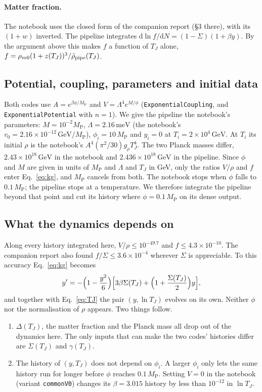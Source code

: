 \documentclass[11pt,a4paper]{article}
\newcommand{\MP}{M_{\mathrm{P}}}
\newcommand{\TJ}{T_{J}}
\newcommand{\GeV}{\,\mathrm{GeV}}
\newcommand{\code}[1]{\texttt{#1}}
\begin{document}
\paragraph{Matter fraction.} The notebook uses the closed form of the companion report
(\S3 there), with its $(1+w)$ inverted. The pipeline integrates $\mathrm{d}\ln
f/\mathrm{d}N = (1-\Sigma)(1+\beta y)$. By the argument above this makes $f$ a function of
$\TJ$ alone, $f = \rho_{m0}(1+z(\TJ))^3/\tilde\rho_{\rm pipe}(\TJ)$.

\subsection{Potential, coupling, parameters and initial data}

Both codes use $A = e^{\beta\phi/\MP}$ and $V = \Lambda^4 e^{M/\phi}$
(\code{ExponentialCoupling}, and \code{ExponentialPotential} with $n=1$). We give the pipeline
the notebook's parameters: $M = 10^{-2}\MP$, $\Lambda = 2.16\,\mathrm{meV}$ (the notebook's
$v_0 = 2.16\times10^{-12}\GeV/\MP$), $\phi_i = 10\,\MP$ and $y_i = 0$ at $T_i = 2\times10^4\GeV$.
At $T_i$ its initial $\rho$ is the notebook's $A^4(\pi^2/30)g_\rho\TJ^4$. The two Planck
masses differ, $2.43\times10^{18}\GeV$ in the notebook and $2.436\times10^{18}\GeV$ in the
pipeline. Since $\phi$ and $M$ are given in units of $\MP$ and $\Lambda$ and $\TJ$ in GeV,
only the ratios $V/\rho$ and $f$ enter Eq.~\eqref{eq:kg}, and $\MP$ cancels from both. The
notebook stops when $\phi$ falls to $0.1\,\MP$; the pipeline stops at a temperature. We
therefore integrate the pipeline beyond that point and cut its history where $\phi = 0.1\,\MP$
on its dense output.

\subsection{What the dynamics depends on}

Along every history integrated here, $V/\rho \le 10^{-49.7}$ and $f \le 4.3\times10^{-10}$.
The companion report also found $f/\Sigma \le 3.6\times10^{-4}$ wherever $\Sigma$ is
appreciable. To this accuracy Eq.~\eqref{eq:kg} becomes
\begin{equation}
  y' = -\Bigl(1-\frac{y^2}{6}\Bigr)\Bigl[3\beta\Sigma(\TJ) + \Bigl(1 + \frac{\Sigma(\TJ)}{2}\Bigr)y\Bigr],
  \label{eq:reduced}
\end{equation}
and together with Eq.~\eqref{eq:TJ} the pair $(y, \ln\TJ)$ evolves on its own. Neither $\phi$
nor the normalisation of $\rho$ appears. Two things follow.
\begin{enumerate}
\item $\Delta(\TJ)$, the matter fraction and the Planck mass all drop out of the dynamics here.
  The only inputs that can make the two codes' histories differ are $\Sigma(\TJ)$ and
  $\gamma(\TJ)$.
\item The history of $(y, \TJ)$ does not depend on $\phi_i$. A larger $\phi_i$ only lets the
  same history run for longer before $\phi$ reaches $0.1\,\MP$. Setting $V = 0$ in the notebook
  (variant \code{commonV0}) changes its $\beta = 3.015$ history by less than $10^{-12}$ in
  $\ln\TJ$.
\end{enumerate}
\end{document}
